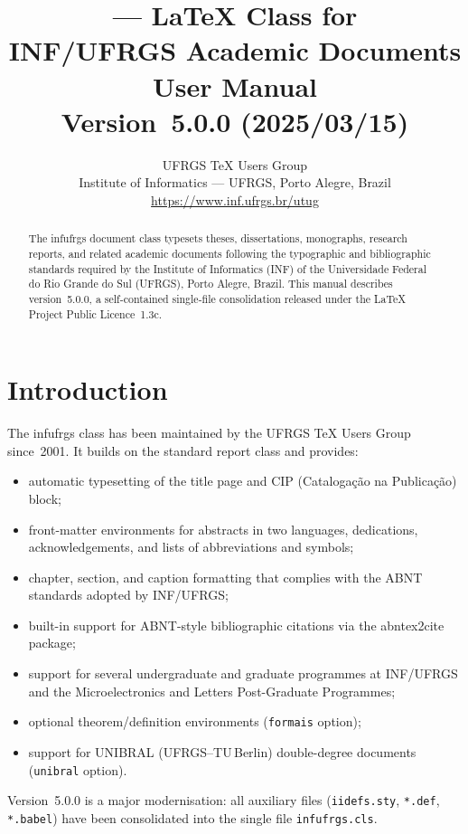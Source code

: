 \documentclass[11pt,a4paper]{article}
\title{%
  \pkg{infufrgs} — LaTeX Class for\\[4pt]
  INF/UFRGS Academic Documents\\[8pt]
  \large\normalfont User Manual\\[4pt]
  \large\normalfont Version~5.0.0 (2025/03/15)}
\author{UFRGS TeX Users Group\\
  \small Institute of Informatics — UFRGS, Porto Alegre, Brazil\\
  \small\url{https://www.inf.ufrgs.br/utug}}
\date{}
\newcommand{\pkg}[1]{\textsf{#1}}
\newcommand{\cls}[1]{\textsf{#1}}
\newcommand{\opt}[1]{\texttt{#1}}
\newcommand{\file}[1]{\texttt{#1}}
\begin{document}

\maketitle
\thispagestyle{empty}

\begin{abstract}
  \noindent
  The \cls{infufrgs} document class typesets theses, dissertations,
  monographs, research reports, and related academic documents following
  the typographic and bibliographic standards required by the Institute
  of Informatics (INF) of the Universidade Federal do Rio Grande do Sul
  (UFRGS), Porto Alegre, Brazil.  This manual describes version~5.0.0,
  a self-contained single-file consolidation released under the
  LaTeX Project Public Licence~1.3c.
\end{abstract}

\tableofcontents

\section{Introduction}

The \cls{infufrgs} class has been maintained by the UFRGS TeX Users Group
since~2001.  It builds on the standard \cls{report} class and provides:
%
\begin{itemize}
  \item automatic typesetting of the title page and CIP
        (Catalogação na Publicação) block;
  \item front-matter environments for abstracts in two languages,
        dedications, acknowledgements, and lists of abbreviations
        and symbols;
  \item chapter, section, and caption formatting that complies with
        the ABNT standards adopted by INF/UFRGS;
  \item built-in support for ABNT-style bibliographic citations via
        the \pkg{abntex2cite} package;
  \item support for several undergraduate and graduate programmes
        at INF/UFRGS and the Microelectronics and Letters
        Post-Graduate Programmes;
  \item optional theorem/definition environments (\opt{formais} option);
  \item support for UNIBRAL (UFRGS–TU\,Berlin) double-degree documents
        (\opt{unibral} option).
\end{itemize}
%
Version~5.0.0 is a major modernisation: all auxiliary files
(\file{iidefs.sty}, \file{*.def}, \file{*.babel}) have been
consolidated into the single file \file{infufrgs.cls}.
\end{document}
